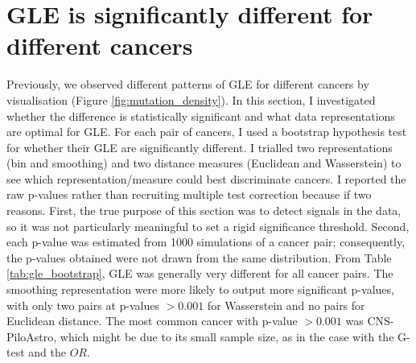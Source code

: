 

\section{GLE is significantly different for different cancers}\label{gle:bootstrap}
Previously, we observed different patterns of GLE for different cancers by visualisation (Figure \ref{fig:mutation_density}). In this section, I investigated whether the difference is statistically significant and what data representations are optimal for GLE. For each pair of cancers, I used a bootstrap hypothesis test for whether their GLE are significantly different. I trialled two representations (bin and smoothing) and two distance measures (Euclidean and Wasserstein) to see which representation/measure could best discriminate cancers. I reported the raw p-values rather than recruiting multiple test correction because if two reasons. First, the true purpose of this section was to detect signals in the data, so it was not particularly meaningful to set a rigid significance threshold. Second, each p-value was estimated from 1000 simulations of a cancer pair; consequently, the p-values obtained were not drawn from the same distribution. From Table \ref{tab:gle_bootstrap}, GLE was generally very different for all cancer pairs. The smoothing representation were more likely to output more significant p-values, with only two pairs at p-values $>0.001$ for Wasserstein and no pairs for Euclidean distance. The most common cancer with p-value $>0.001$ was CNS-PiloAstro, which might be due to its small sample size, as in the case with the G-test and the $OR$. 



